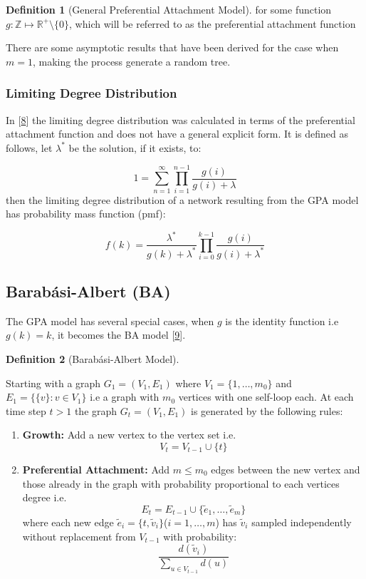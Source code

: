 \documentclass[
  10pt,
  a4paper,
]{scrreprt}
\providecommand{\tightlist}{%
  \setlength{\itemsep}{0pt}\setlength{\parskip}{0pt}}\usepackage{longtable,booktabs,array}
\theoremstyle{definition}
\newtheorem{definition}{Definition}[section]
\theoremstyle{plain}
\theoremstyle{plain}
\theoremstyle{plain}
\theoremstyle{remark}
\begin{document}
{\begin{definition}[General Preferential Attachment
Model]
for some function \(g: \mathbb Z \mapsto \mathbb R^+\setminus\{0\}\),
which will be referred to as the preferential attachment function

\end{definition}

There are some asymptotic results that have been derived for the case
when \(m=1\), making the process generate a random tree.

\hypertarget{limiting-degree-distribution}{%
\subsubsection{Limiting Degree
Distribution}\label{limiting-degree-distribution}}

In {[}\protect\hyperlink{ref-rudas07}{8}{]} the limiting degree
distribution was calculated in terms of the preferential attachment
function and does not have a general explicit form. It is defined as
follows, let \(\lambda^*\) be the solution, if it exists, to:

\[
1=\sum_{n=1}^\infty \prod_{i=1}^{n-1}\displaystyle\frac{g(i)}{g(i)+\lambda}
\] then the limiting degree distribution of a network resulting from the
GPA model has probability mass function (pmf):

\[
f(k) = \displaystyle\frac{\lambda^*}{g(k) + \lambda^*}\prod_{i=0}^{k-1}\displaystyle\frac{g(i)}{g(i)+\lambda^*}
\]

\hypertarget{barabuxe1si-albert-ba}{%
\subsection{Barabási-Albert (BA)}\label{barabuxe1si-albert-ba}}

The GPA model has several special cases, when \(g\) is the identity
function i.e \(g(k)=k\), it becomes the BA model
{[}\protect\hyperlink{ref-Barabasi99}{9}{]}.

\begin{definition}[Barabási-Albert
Model]\protect\hypertarget{def-ba}{}\label{def-ba}

Starting with a graph \(G_1 = (V_1, E_1)\) where
\(V_1 = \{1,\ldots,m_0\}\) and \(E_1 = \{\{v\}:v\in V_1\}\) i.e a graph
with \(m_0\) vertices with one self-loop each. At each time step \(t>1\)
the graph \(G_t = (V_1, E_1)\) is generated by the following rules:

\begin{enumerate}
\def\labelenumi{\arabic{enumi}.}
\tightlist
\item
  \textbf{Growth:} Add a new vertex to the vertex set i.e.~\[
  V_t = V_{t-1} \cup \{t\}
  \]
\item
  \textbf{Preferential Attachment:} Add \(m\le m_0\) edges between the
  new vertex and those already in the graph with probability
  proportional to each vertices degree i.e.~\[
  E_t  = E_{t-1} \cup \{\tilde e_1, \ldots, \tilde e_m\}
  \] where each new edge
  \(\tilde e_i = \{t, \tilde v_i\}\)(\(i=1,\ldots, m\)) has
  \(\tilde v_i\) sampled independently without replacement from
  \(V_{t-1}\) with probability: \[
  \frac{d(\tilde v_i)}{\sum_{u\in V_{t-1}}d(u)}
  \]
\end{enumerate}


\end{definition}}
\end{document}
